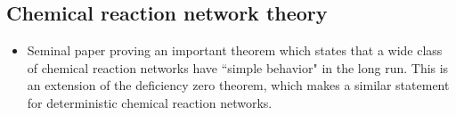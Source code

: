 \documentclass{amsart}
\begin{document}
\subsection{Chemical reaction network theory}
\begin{itemize}
\item \cite{Anderson2008aa} Seminal paper proving an important theorem which states that a wide class of chemical reaction networks have ``simple behavior" in the long run. This is an extension of the deficiency zero theorem, which makes a similar statement for deterministic chemical reaction networks. 
\end{itemize}


\newpage


\end{document}
